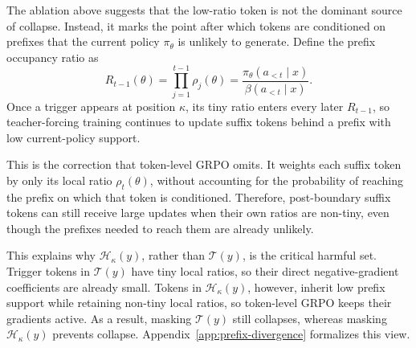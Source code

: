 The ablation above suggests that the low-ratio token is not the dominant source of collapse.
Instead, it marks the point after which tokens are conditioned on
prefixes that the current policy $\pi_\theta$ is unlikely to generate. Define
the prefix occupancy ratio as
\begin{equation}
    R_{t-1}(\theta)
    =
    \prod_{j=1}^{t-1}\rho_j(\theta)
    =
    \frac{\pi_\theta(a_{<t}\mid x)}
         {\beta(a_{<t}\mid x)} .
    \label{eq:prefix_ratio}
\end{equation}
Once a trigger appears at position $\kappa$, its tiny ratio enters every later
$R_{t-1}$, so teacher-forcing training continues to update suffix tokens behind
a prefix with low current-policy support.

This is the correction that token-level GRPO omits.
It weights each
suffix token by only its local ratio $\rho_t(\theta)$, without accounting for
the probability of reaching the prefix on which that token is conditioned.
Therefore, post-boundary suffix tokens can still receive large updates when their own
ratios are non-tiny, even though the prefixes needed to reach them are already
unlikely.

This explains why $\mathcal H_\kappa(y)$, rather than $\mathcal T(y)$, is the
critical harmful set. Trigger tokens in $\mathcal T(y)$ have tiny local ratios,
so their direct negative-gradient coefficients are already small. Tokens in
$\mathcal H_\kappa(y)$, however, inherit low prefix support while retaining
non-tiny local ratios, so token-level GRPO keeps their gradients active. As a
result, masking $\mathcal T(y)$ still collapses, whereas masking
$\mathcal H_\kappa(y)$ prevents collapse. Appendix~\ref{app:prefix-divergence}
formalizes this view. 



